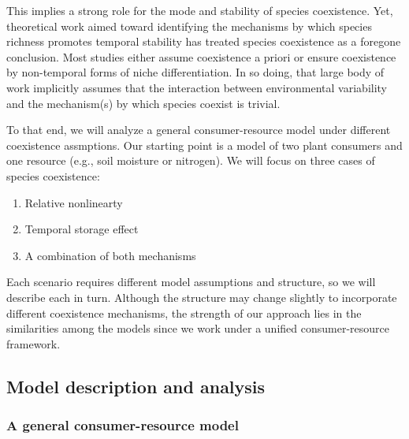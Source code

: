 \documentclass[12pt,]{article}
\begin{document}
This implies a strong role for the mode and stability of species
coexistence. Yet, theoretical work aimed toward identifying the
mechanisms by which species richness promotes temporal stability has
treated species coexistence as a foregone conclusion. Most studies
either assume coexistence a priori or ensure coexistence by non-temporal
forms of niche differentiation. In so doing, that large body of work
implicitly assumes that the interaction between environmental
variability and the mechanism(s) by which species coexist is trivial.

To that end, we will analyze a general consumer-resource model under
different coexistence assmptions. Our starting point is a model of two
plant consumers and one resource (e.g., soil moisture or nitrogen). We
will focus on three cases of species coexistence:

\begin{enumerate}
  \item Relative nonlinearty
  \item Temporal storage effect
  \item A combination of both mechanisms
\end{enumerate}

Each scenario requires different model assumptions and structure, so we
will describe each in turn. Although the structure may change slightly
to incorporate different coexistence mechanisms, the strength of our
approach lies in the similarities among the models since we work under a
unified consumer-resource framework.

\subsection{Model description and
analysis}\label{model-description-and-analysis}

\subsubsection{A general consumer-resource
model}\label{a-general-consumer-resource-model}
\end{document}
